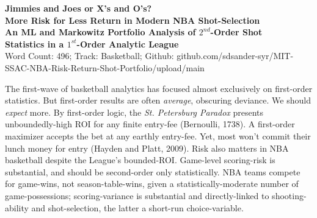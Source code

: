 \documentclass[10pt]{article}
\newcommand{\sect}[1]{\vspace{0pt}\noindent{\bfseries\color{navy}#1}\par\nobreak\vspace{-1pt}}
\begin{document}
\begin{center}
{\Large\bfseries\color{navy} Jimmies and Joes or X's and O's?\\[1pt]
More Risk for Less Return in Modern NBA Shot-Selection}\\[3pt]
{\large\bfseries An ML and Markowitz Portfolio Analysis of $2^{nd}$-Order Shot\\[1pt]
Statistics in a $1^{st}$-Order Analytic League}\\[4pt]
{\small Word Count: 496; Track: Basketball; Github: github.com/sdsander-syr/MIT-SSAC-NBA-Risk-Return-Shot-Portfolio/upload/main }
\end{center}
\vspace{1pt}

\sect{1. Introduction}
\noindent
The first-wave of basketball analytics has focused almost exclusively on
first-order statistics. But first-order results are often \emph{average}, obscuring deviance.
We should \emph{expect} more. By first-order logic, the \emph{St. Petersburg Paradox} presents unboundedly-high ROI for any finite entry-fee (Bernoulli, 1738). A first-order maximizer accepts the bet at any earthly entry-fee. Yet, most won't commit their lunch money for entry (Hayden and Platt, 2009). Risk also matters in NBA basketball despite the League's bounded-ROI. Game-level scoring-risk is substantial, and should be second-order only statistically. NBA teams compete for game-wins, not season-table-wins, given a statistically-moderate number of game-possessions; scoring-variance is substantial and directly-linked to shooting-ability and shot-selection, the latter a short-run choice-variable.
\end{document}
